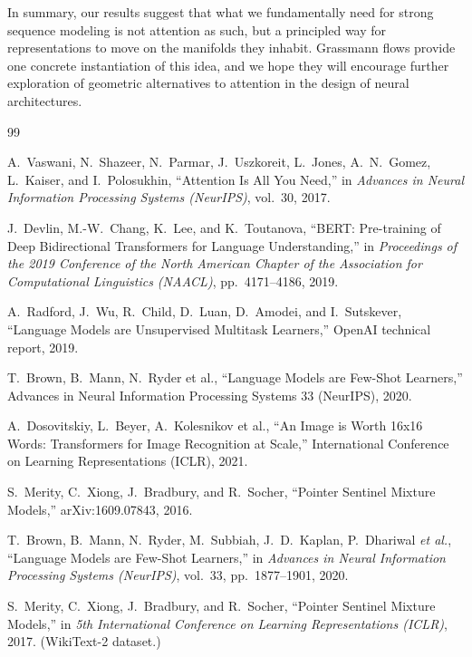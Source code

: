 \documentclass[11pt]{article}
\begin{document}
In summary, our results suggest that what we fundamentally need for strong sequence modeling is not attention as such, but a principled way for representations to move on the manifolds they inhabit. Grassmann flows provide one concrete instantiation of this idea, and we hope they will encourage further exploration of geometric alternatives to attention in the design of neural architectures.


\begin{thebibliography}{99}

A.~Vaswani, N.~Shazeer, N.~Parmar, J.~Uszkoreit, L.~Jones, A.~N.~Gomez, L.~Kaiser, and I.~Polosukhin,
``Attention Is All You Need,''
in \emph{Advances in Neural Information Processing Systems (NeurIPS)}, vol.~30, 2017.

J.~Devlin, M.-W.~Chang, K.~Lee, and K.~Toutanova,
``BERT: Pre-training of Deep Bidirectional Transformers for Language Understanding,''
in \emph{Proceedings of the 2019 Conference of the North American Chapter of the Association for Computational Linguistics (NAACL)}, pp.~4171--4186, 2019.

A.~Radford, J.~Wu, R.~Child, D.~Luan, D.~Amodei, and I.~Sutskever,
``Language Models are Unsupervised Multitask Learners,''
OpenAI technical report, 2019.

  T.~Brown, B.~Mann, N.~Ryder et al.,
  ``Language Models are Few-Shot Learners,''
  Advances in Neural Information Processing Systems 33 (NeurIPS), 2020.

  A.~Dosovitskiy, L.~Beyer, A.~Kolesnikov et al.,
  ``An Image is Worth 16x16 Words: Transformers for Image Recognition at Scale,''
  International Conference on Learning Representations (ICLR), 2021.

  S.~Merity, C.~Xiong, J.~Bradbury, and R.~Socher,
  ``Pointer Sentinel Mixture Models,''
  arXiv:1609.07843, 2016.



T.~Brown, B.~Mann, N.~Ryder, M.~Subbiah, J.~D.~Kaplan, P.~Dhariwal \emph{et al.},
``Language Models are Few-Shot Learners,''
in \emph{Advances in Neural Information Processing Systems (NeurIPS)}, vol.~33, pp.~1877--1901, 2020.

S.~Merity, C.~Xiong, J.~Bradbury, and R.~Socher,
``Pointer Sentinel Mixture Models,''
in \emph{5th International Conference on Learning Representations (ICLR)}, 2017.
(WikiText-2 dataset.)


\end{thebibliography}
\end{document}
